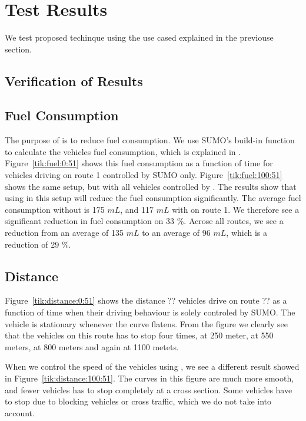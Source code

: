 \section{Test Results}
We test proposed techinque using the use cased explained in the previouse section.

\subsection{Verification of Results}

\subsection{Fuel Consumption}
The purpose of \tech is to reduce fuel consumption. 
We use SUMO's build-in function to calculate the vehicles fuel consumption, which is explained in \cite{SUMOFuel}.
Figure~\ref{tik:fuel:0:51} shows this fuel consumption as a function of time for vehicles driving on route 1 controlled by SUMO only. 
Figure~\ref{tik:fuel:100:51} shows the same setup, but with all vehicles controlled by \tech.
The results show that using \tech in this setup will reduce the fuel consumption significantly.
The average fuel consumption without \tech is 175 $mL$, and 117 $mL$ with \tech on route 1. 
We therefore see a significant reduction in fuel consumption on 33 \%.
Acrose all routes, we see a reduction from an average of 135 $mL$ to an average of 96 $mL$, which is a reduction of 29 \%.
%
%


\subsection{Distance}
Figure~\ref{tik:distance:0:51} shows the distance ?? vehicles drive on route ?? as a function of time when their driving behaviour is solely controled by SUMO. 
The vehicle is stationary whenever the curve flatens.
From the figure we clearly see that the vehicles on this route has to stop four times, at 250 meter, at 550 meters, at 800 meters and again at 1100 metets.

When we control the speed of the vehicles using \tech, we see a different result showed in Figure~\ref{tik:distance:100:51}.
The curves in this figure are much more smooth, and fewer vehicles has to stop completely at a cross section.
Some vehicles have to stop due to blocking vehicles or cross traffic, which we do not take into account.

